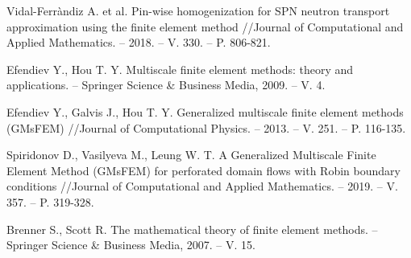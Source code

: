 \documentclass[runningheads]{llncs}
\begin{document}
\begin{thebibliography}{8}
Vidal-Ferràndiz A. et al. Pin-wise homogenization for SPN neutron transport approximation using the finite element method //Journal of Computational and Applied Mathematics. – 2018. – V. 330. – P. 806-821.

Efendiev Y., Hou T. Y. Multiscale finite element methods: theory and applications. – Springer Science \& Business Media, 2009. – V. 4.

Efendiev Y., Galvis J., Hou T. Y. Generalized multiscale finite element methods (GMsFEM) //Journal of Computational Physics. – 2013. – V. 251. – P. 116-135.

Spiridonov D., Vasilyeva M., Leung W. T. A Generalized Multiscale Finite Element Method (GMsFEM) for perforated domain flows with Robin boundary conditions //Journal of Computational and Applied Mathematics. – 2019. – V. 357. – P. 319-328.

Brenner S., Scott R. The mathematical theory of finite element methods. – Springer Science \& Business Media, 2007. – V. 15.

\end{thebibliography}
\end{document}
